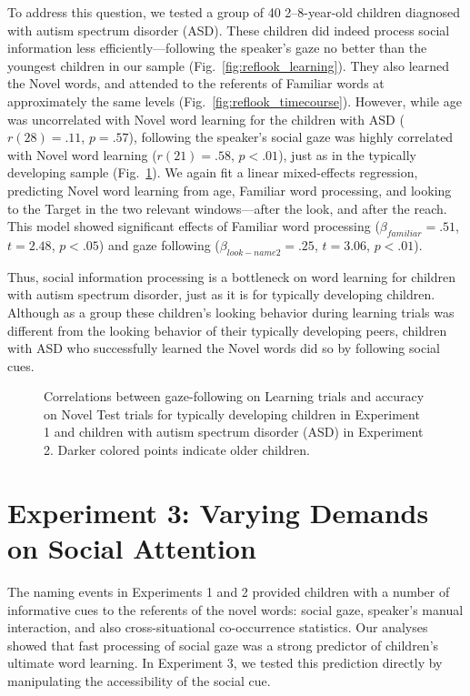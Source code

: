 \documentclass[jou,floatsintext]{apa6}
\begin{document}
To address this question, we tested a group of 40 2--8-year-old children diagnosed with autism spectrum disorder (ASD). These children did indeed process social information less efficiently---following the speaker's gaze no better than the youngest children in our sample (Fig.~\ref{fig:reflook_learning}). They also learned the Novel words, and attended to the referents of Familiar words at approximately the same levels (Fig.~\ref{fig:reflook_timecourse}). However, while age was uncorrelated with Novel word learning for the children with ASD ($r(28) = .11$, $p =.57$), following the speaker's social gaze was highly correlated with Novel word learning ($r(21) = .58$, $p <.01$), just as in the typically developing sample (Fig.~\ref{fig:corr_plot}). We again fit a linear mixed-effects regression, predicting Novel word learning from age, Familiar word processing, and looking to the Target in the two relevant windows---after the look, and after the reach. This model showed significant effects of Familiar word processing ($\beta_{familiar} = .51$, $t = 2.48$, $p < . 05$) and gaze following ($\beta_{look-name2} = .25$, $t = 3.06$, $p < .01$).

Thus, social information processing is a bottleneck on word learning for children with autism spectrum disorder, just as it is for typically developing children. Although as a group these children's looking behavior during learning trials was different from the looking behavior of their typically developing peers, children with ASD who successfully learned the Novel words did so by following social cues.

\begin{figure}[tb]
	\caption{\label{fig:corr_plot}Correlations between gaze-following on Learning trials and accuracy on Novel Test trials for typically developing children in Experiment 1 and children with autism spectrum disorder (ASD) in Experiment 2. Darker colored points indicate older children.}

\end{figure}

\section{Experiment 3: Varying Demands on Social Attention}

The naming events in Experiments 1 and 2 provided children with a number of informative cues to the referents of the novel words: social gaze, speaker's manual interaction, and also cross-situational co-occurrence statistics. Our analyses showed that fast processing of social gaze was a strong predictor of children's ultimate word learning. In Experiment 3, we tested this prediction directly by manipulating the accessibility of the social cue.
\end{document}
